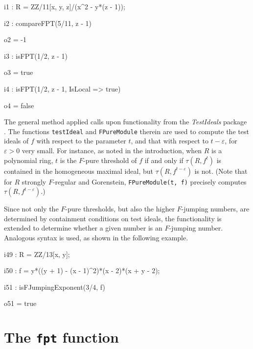 \documentclass{amsart}
\begin{document}
\medspace
{\small
{}
\begin{MyVerbatim}

i1 : R = ZZ/11[x, y, z]/(x^2 - y*(z - 1));

i2 : compareFPT(5/11, z - 1)

o2 = -1

i3 : isFPT(1/2, z - 1)

o3 = true

i4 : isFPT(1/2, z - 1, IsLocal => true)

o4 = false
\end{MyVerbatim}
}
\medspace

The general method applied calls upon functionality from the \emph{TestIdeals} package \cite{TestIdealsPackage, TestIdealsPaper}.  The functions {\tt testIdeal} and {\tt FPureModule} therein are used
to compute the test ideals of $f$ with respect to the parameter $t$, and that with respect to $t - \varepsilon$, for $\varepsilon>0$ very small. For instance, as noted in the introduction, when $R$ is a polynomial ring, $t$ is the $F$-pure threshold of $f$ if and only if $\tau(R, f^t)$ is contained in the homogeneous maximal ideal, but
$\tau(R, f^{t-\varepsilon})$ is not.
(Note that for $R$ strongly $F$-regular and Gorenstein, {\tt FPureModule(t, f)} precisely computes $\tau(R, f^{t-\varepsilon})$.)

Since not only the $F$-pure thresholds, but also the higher $F$-jumping numbers, are determined by containment conditions on test ideals, the functionality is extended to determine whether a given number is an $F$-jumping number.
Analogous syntax is used, as shown in the following example.

\medspace
{\small
{}
\begin{MyVerbatim}

i49 : R = ZZ/13[x, y];

i50 : f = y*((y + 1) - (x - 1)^2)*(x - 2)*(x + y - 2);

i51 : isFJumpingExponent(3/4, f)

o51 = true
\end{MyVerbatim}
}
\medspace

\section{The {\tt fpt} function}
\label{sec.FPT}
\end{document}
